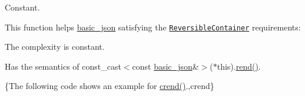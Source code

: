   Constant.

This function helps {\ttfamily \hyperlink{classnlohmann_1_1basic__json}{basic\-\_\-json}} satisfying the \href{http://en.cppreference.com/w/cpp/concept/ReversibleContainer}{\tt Reversible\-Container} requirements\-:
\begin{DoxyItemize}
\item The complexity is constant.
\item Has the semantics of {\ttfamily const\-\_\-cast$<$const \hyperlink{classnlohmann_1_1basic__json}{basic\-\_\-json}\&$>$($\ast$this).\hyperlink{classnlohmann_1_1basic__json_aaa160a960dd3dd90856a72b1d8dbe707}{rend()}}.
\end{DoxyItemize}

\{The following code shows an example for {\ttfamily \hyperlink{classnlohmann_1_1basic__json_aa7084e62b93ef0236698b246a58bb2da}{crend()}}.,crend\}

